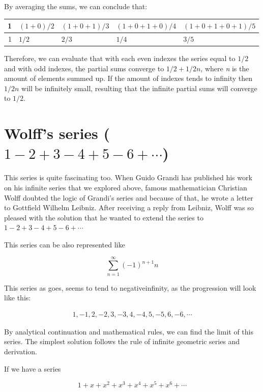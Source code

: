 \documentclass[11pt]{article}
\begin{document}
By averaging the sums, we can conclude that:

\begin{center}
\begin{tabular}{rllll}
1 & \((1+0)/2\) & \((1+0+1)/3\) & \((1+0+1+0)/4\) & \((1+0+1+0+1)/5\)\\
\hline
1 & \(1/2\) & \(2/3\) & \(1/4\) & \(3/5\)\\
\end{tabular}
\end{center}

Therefore, we can evaluate that with each even indexes the series equal to \(1/2\)
and with odd indexes, the partial sums converge to \(1/2+1/2n\), where \emph{n} is the
amount of elements summed up. If the amount of indexes tends to infinity then
\(1/2n\) will be infinitely small, resulting that the infinite partial sums will
converge to \(1/2\). 

\section{Wolff's series (\(1-2+3-4+5-6+\cdots\))}
\label{sec:org3361655}

This series is quite fascinating too. When Guido Grandi has published his work
on his infinite series that we explored above, famous mathematician Christian
Wolff doubted the logic of Grandi's series and because of that, he wrote a
letter to Gottfield Wilhelm Leibniz. After receiving a reply \cite{Wolff} from
Leibniz, Wolff was so pleased with the solution that he wanted to extend the
series to \(1-2+3-4+5-6+\cdots\) 

This series can be also represented like

\begin{equation*}
\sum_{n=1}^\infty (-1)^{n+1}n 
\end{equation*}

This series as goes, seems to tend to negativeinfinity, as the
progression will look like this: 

\begin{align*}
1, -1, 2, -2, 3, -3, 4, -4, 5, -5, 6, -6, \cdots
\end{align*}

By analytical continuation and mathematical rules, we can find the limit of this
series. The simplest solution follows the rule of infinite geometric series and
derivation. 

If we have a series

\begin{equation*}
1+x+x^2+x^3+x^4+x^5+x^6+\cdots
\end{equation*}
\end{document}
